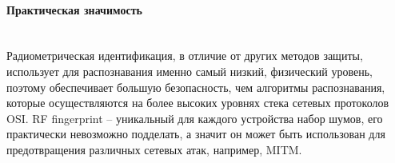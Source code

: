 	\paragraph{Практическая значимость} 
	\noindent \\
    	Радиометрическая идентификация, в отличие от других методов защиты, использует для распознавания именно самый низкий, физический уровень, поэтому обеспечивает большую безопасность, чем алгоритмы распознавания, которые осуществляются на более высоких уровнях стека сетевых протоколов OSI.
        RF fingerprint – уникальный для каждого устройства набор шумов, его практически невозможно подделать, а значит он может быть использован для предотвращения различных сетевых атак, например, MITM.

	
	
